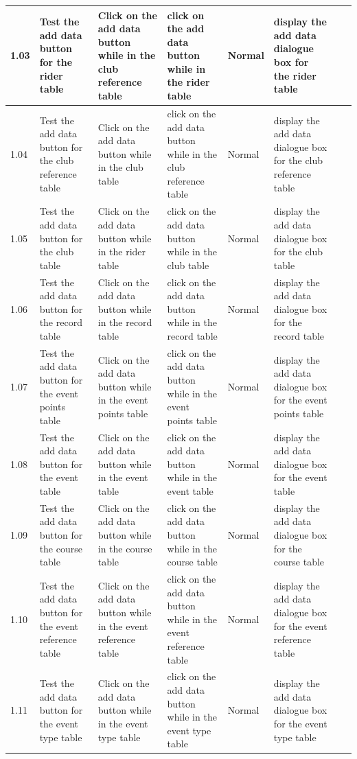 \begin{landscape}
\begin{center}
\begin{longtable}{|p{1.5cm}|p{2.5cm}|p{2.5cm}|p{2cm}|p{2cm}|p{2cm}|p{2cm}|p{2cm}|}
        1.03 & Test the add data button for the rider table & Click on the add data button while in the club reference table & click on the add data button while in the rider table & Normal & display the add data dialogue box for the rider table & & \\ \hline
        1.04 & Test the add data button for the club reference table & Click on the add data button while in the club table & click on the add data button while in the club reference table & Normal & display the add data dialogue box for the club reference table & & \\ \hline
        1.05 & Test the add data button for the club  table & Click on the add data button while in the rider table & click on the add data button while in the club table & Normal & display the add data dialogue box for the club  table & & \\ \hline
        1.06 & Test the add data button for the record  table & Click on the add data button while in the record table & click on the add data button while in the record table & Normal & display the add data dialogue box for the record  table & & \\ \hline
        1.07 & Test the add data button for the event points  table & Click on the add data button while in the event points table & click on the add data button while in the event points table & Normal & display the add data dialogue box for the event points  table & & \\ \hline
        1.08 & Test the add data button for the event  table & Click on the add data button while in the event table & click on the add data button while in the event table & Normal & display the add data dialogue box for the event  table & & \\ \hline
        1.09 & Test the add data button for the course  table & Click on the add data button while in the course table & click on the add data button while in the course table & Normal & display the add data dialogue box for the course  table & & \\ \hline
        1.10 & Test the add data button for the event reference  table & Click on the add data button while in the event reference table & click on the add data button while in the event reference table & Normal & display the add data dialogue box for the event reference  table & & \\ \hline
        1.11 & Test the add data button for the event type  table & Click on the add data button while in the event type table & click on the add data button while in the event type table & Normal & display the add data dialogue box for the event type  table & & \\ \hline
        

\end{longtable}
\end{center}
\end{landscape}
